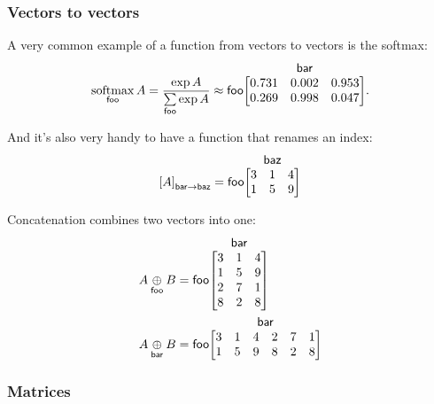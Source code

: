 \documentclass{article}
\makeatletter
\newcommand{\nmatrix}[3]{\name{#1}\begin{array}[b]{@{}c@{}}\name{#2}\\\begin{bmatrix}#3\end{bmatrix}\end{array}}
\makeatother
\begin{document}
\subsubsection{Vectors to vectors}

A very common example of a function from vectors to vectors is the softmax:
\begin{equation*}
  \nfun{foo}{softmax} A = \frac{\exp A}{\nsum{foo} \exp A} \approx \nmatrix{foo}{bar}{
    0.731 & 0.002 & 0.953 \\
    0.269 & 0.998 & 0.047
  }.
\end{equation*}

And it's also very handy to have a function that renames an index:
\begin{equation*}
\nmov{bar}{baz}{A} = \nmatrix{foo}{baz}{
  3 & 1 & 4 \\
  1 & 5 & 9
}
\end{equation*}

Concatenation combines two vectors into one:
\begin{align*}
  A \ncat{foo} B &= \nmatrix{foo}{bar}{
    3 & 1 & 4 \\
    1 & 5 & 9 \\
    2 & 7 & 1 \\
    8 & 2 & 8
  } \\
  A \ncat{bar} B &= \nmatrix{foo}{bar}{
    3 & 1 & 4 & 2 & 7 & 1 \\
    1 & 5 & 9 & 8 & 2 & 8
  }
\end{align*}

\subsubsection{Matrices}
\end{document}
